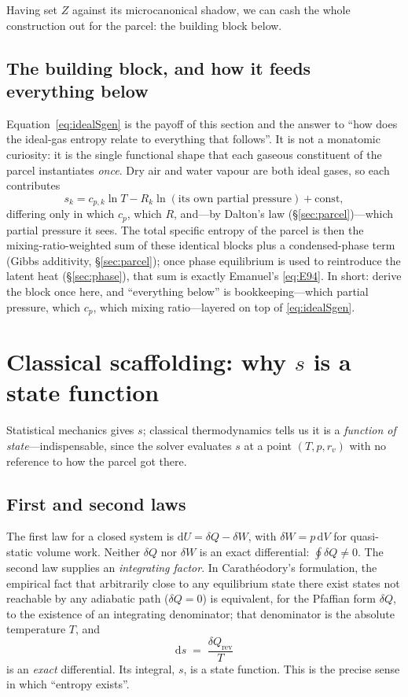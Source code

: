 \documentclass[11pt,a4paper]{article}
\theoremstyle{definition}
\newcommand{\rvv}{r_v}
\newcommand{\dd}{\mathrm{d}}
\begin{document}
Having set $Z$ against its microcanonical shadow, we can cash the whole
construction out for the parcel: the building block below.


\subsection{The building block, and how it feeds everything below}
\label{ssec:buildingblock}

Equation~\eqref{eq:idealSgen} is the payoff of this section and the answer to
``how does the ideal-gas entropy relate to everything that follows''. It is not
a monatomic curiosity: it is the single functional shape that each gaseous
constituent of the parcel instantiates \emph{once}. Dry air and water vapour are
both ideal gases, so each contributes
\begin{equation}\label{eq:perspecies}
s_k=c_{p,k}\ln T-R_k\ln(\text{its own partial pressure})+\mathrm{const},
\end{equation}
differing only in which $c_p$, which $R$, and---by Dalton's law
(\S\ref{sec:parcel})---which partial pressure it sees. The total specific
entropy of the parcel is then the mixing-ratio-weighted sum of these identical
blocks plus a condensed-phase term (Gibbs additivity, \S\ref{sec:parcel}); once
phase equilibrium is used to reintroduce the latent heat (\S\ref{sec:phase}),
that sum is exactly Emanuel's \eqref{eq:E94}. In short: derive the block once
here, and ``everything below'' is bookkeeping---which partial pressure, which
$c_p$, which mixing ratio---layered on top of \eqref{eq:idealSgen}.

\section{Classical scaffolding: why \texorpdfstring{$s$}{s} is a state function}
\label{sec:classical}

Statistical mechanics gives $s$; classical thermodynamics tells us it is a
\emph{function of state}---indispensable, since the solver evaluates $s$ at a
point $(T,p,\rvv)$ with no reference to how the parcel got there.

\subsection{First and second laws}

The first law for a closed system is $\dd U=\delta Q-\delta W$, with
$\delta W=p\,\dd V$ for quasi-static volume work. Neither $\delta Q$ nor
$\delta W$ is an exact differential: $\oint \delta Q\neq 0$. The second law
supplies an \emph{integrating factor}. In Carath\'eodory's formulation, the
empirical fact that arbitrarily close to any equilibrium state there exist
states not reachable by any adiabatic path ($\delta Q=0$) is equivalent, for
the Pfaffian form $\delta Q$, to the existence of an integrating denominator;
that denominator is the absolute temperature $T$, and
\begin{equation}\label{eq:dS}
\dd s \;=\; \frac{\delta Q_{\mathrm{rev}}}{T}
\end{equation}
is an \emph{exact} differential. Its integral, $s$, is a state function. This
is the precise sense in which ``entropy exists''.
\end{document}
